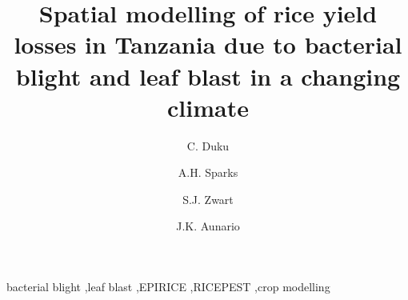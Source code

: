 \documentclass[preprint,12pt]{elsarticle}
\begin{document}
\begin{frontmatter}



\title{Spatial modelling of rice yield losses in Tanzania due to bacterial blight and leaf blast in a changing climate} 


\author[AfricaRice, WUR]{C. Duku}
\author[IRRI]{A.H. Sparks}
\author[AfricaRice]{S.J. Zwart}
\author[IRRI]{J.K. Aunario}


\address[AfricaRice]{Africa Rice Center (AfricaRice), 01 BP 2031, Cotonou, BENIN}
\address[WUR]{Somewhere in Europe}
\address[IRRI]{International Rice Research Institute (IRRI), DAPO Box 7777, Metro Manila, 1301, PHILIPPINES}

\begin{abstract}

\end{abstract}

\begin{keyword}
bacterial blight \sep leaf blast \sep EPIRICE \sep RICEPEST \sep crop modelling
\end{keyword}

\end{frontmatter}



\linenumbers
\end{document}
